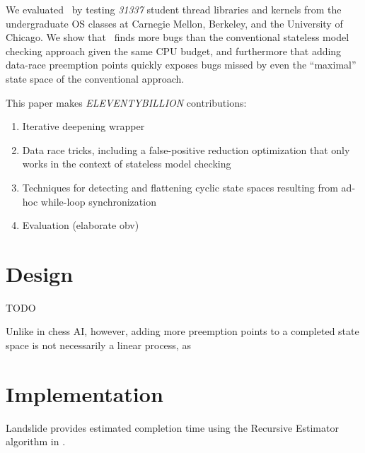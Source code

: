 \documentclass[pldi]{sigplanconf-pldi15}
\begin{document}
We evaluated \quicksand~by testing
{\Large \em 31337}
student thread libraries and kernels from the undergraduate OS classes at Carnegie Mellon, Berkeley, and the University of Chicago.
We show that \quicksand~finds more bugs than the conventional stateless model checking approach given the same CPU budget,
and furthermore that adding data-race preemption points quickly exposes bugs missed by even the ``maximal'' state space of the conventional approach.

This paper makes {\Large \em ELEVENTYBILLION} contributions:
\begin{enumerate}
	\item Iterative deepening wrapper
	\item Data race tricks, including a false-positive reduction optimization that only works in the context of stateless model checking
	\item Techniques for detecting and flattening cyclic state spaces resulting from ad-hoc while-loop synchronization %
	\item Evaluation (elaborate obv)
\end{enumerate}


\section{Design}

TODO

Unlike in chess AI, however, adding more preemption points to a completed state space is not necessarily a linear process, as  %



\section{Implementation}

Landslide provides estimated completion time using the Recursive Estimator algorithm in \cite{estimation}.

\end{document}
